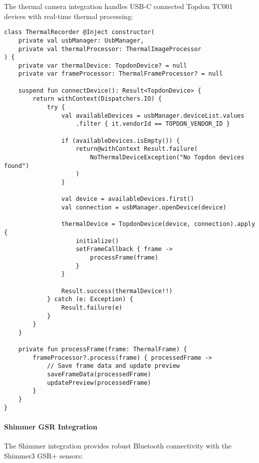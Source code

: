 \documentclass[12pt,a4paper]{report}
\begin{document}
The thermal camera integration handles USB-C connected Topdon TC001 devices with real-time thermal processing:

\begin{verbatim}
class ThermalRecorder @Inject constructor(
    private val usbManager: UsbManager,
    private val thermalProcessor: ThermalImageProcessor
) {
    private var thermalDevice: TopdonDevice? = null
    private var frameProcessor: ThermalFrameProcessor? = null

    suspend fun connectDevice(): Result<TopdonDevice> {
        return withContext(Dispatchers.IO) {
            try {
                val availableDevices = usbManager.deviceList.values
                    .filter { it.vendorId == TOPDON_VENDOR_ID }

                if (availableDevices.isEmpty()) {
                    return@withContext Result.failure(
                        NoThermalDeviceException("No Topdon devices found")
                    )
                }

                val device = availableDevices.first()
                val connection = usbManager.openDevice(device)

                thermalDevice = TopdonDevice(device, connection).apply {
                    initialize()
                    setFrameCallback { frame ->
                        processFrame(frame)
                    }
                }

                Result.success(thermalDevice!!)
            } catch (e: Exception) {
                Result.failure(e)
            }
        }
    }

    private fun processFrame(frame: ThermalFrame) {
        frameProcessor?.process(frame) { processedFrame ->
            // Save frame data and update preview
            saveFrameData(processedFrame)
            updatePreview(processedFrame)
        }
    }
}
\end{verbatim}

\paragraph{Shimmer GSR Integration}

The Shimmer integration provides robust Bluetooth connectivity with the Shimmer3 GSR+ sensors:
\end{document}
